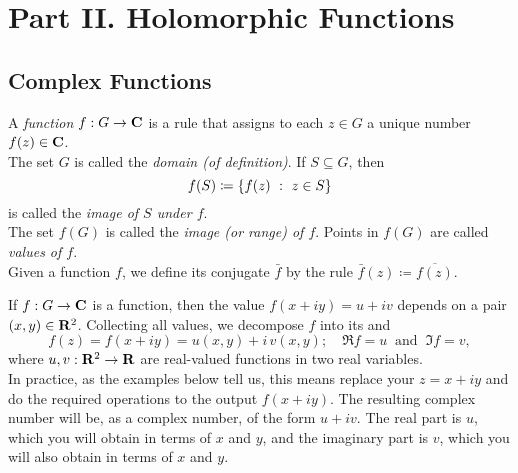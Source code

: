 \section{Part II. Holomorphic Functions}
\subsection{Complex Functions}

%

\begin{definition}
A \emph{function} $f:G \to \mathbf C$ is a rule that assigns to each $z\in G$ a unique number $f(z) \in \mathbf C$.\\[0.5em]
The set $G$ is called the \emph{domain (of definition)}. If $S \subseteq G$, then
\[f(S) \coloneqq \left\{f(z)\ :\ z\in S\right\}\]
is called the \emph{image of $S$ under $f$}.\\[0.5em]
The set $f(G)$ is called the \emph{image (or range) of $f$}. Points in $f(G)$ are called \emph{values of $f$}.\\[1em]
Given a function $f$, we define its conjugate $\bar{f}$ by the rule $\bar{f}(z) \coloneqq \overline{f(z)}$.
\end{definition}

\medskip

\begin{discussion}
If $f:G \to \mathbf C$ is a function, then the value $f(x+iy) = u + iv$ depends on a pair $(x,y) \in \mathbf R^2$. Collecting all values, we decompose $f$ into its  and 
\[f(z) = f(x+iy) = u(x,y) + i\,v(x,y);\quad \Re f = u \ \text{ and } \ \Im f = v,\] where $u,v: \mathbf R^2 \to \mathbf R$ are real-valued functions in two real variables.\\[1em]
In practice, as the examples below tell us, this means replace your $z = x + iy$ and do the required operations to the output $f(x + iy)$. The resulting complex number will be, as a complex number, of the form $u + iv$. The real part is $u$, which you will obtain in terms of $x$ and $y$, and the imaginary part is $v$, which you will also obtain in terms of $x$ and $y$. 
\end{discussion}

